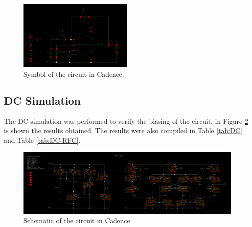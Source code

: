 \begin{figure}[H]
    \centering
    \includegraphics[width=0.5\textwidth]{Images/tb.png}
    \caption{Symbol of the circuit in Cadence.}
    \label{fig:Symbol}
\end{figure}

\subsection{DC Simulation}

The DC simulation was performed to verify the biasing of the circuit, in Figure \ref{fig:DC} is shown the results obtained. The results were also compiled in Table \ref{tab:DC} and Table \ref{tab:DC-RFC}.

\begin{figure}[H]
    \centering
    \includegraphics[width=1\textwidth]{Images/OP.png}
    \caption{Schematic of the circuit in Cadence}
    \label{fig:DC}
\end{figure}


